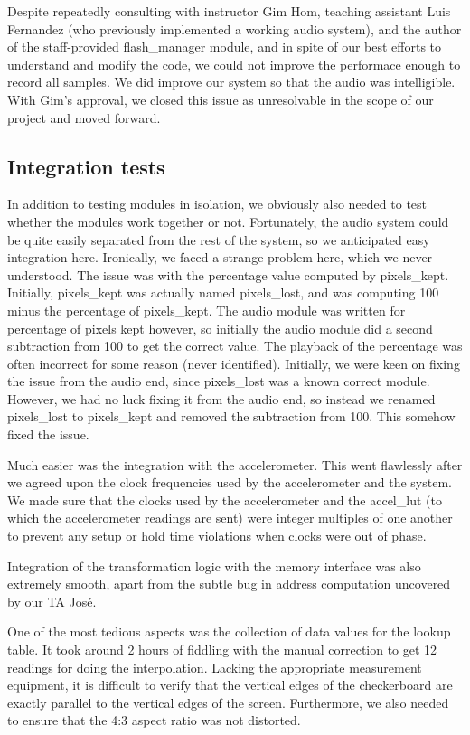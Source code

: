 \documentclass{article}
\begin{document}
Despite repeatedly consulting with instructor Gim Hom, teaching assistant Luis Fernandez (who previously implemented a working audio system), and the author of the staff-provided flash\_manager module,
and in spite of our best efforts to understand and modify the code,
we could not improve the performace enough to record all samples.
We did improve our system so that the audio was intelligible.
With Gim's approval, we closed this issue as unresolvable in the scope of our project and moved forward.

\subsection{Integration tests}
In addition to testing modules in isolation, we obviously also needed to test whether the modules work together or not.
Fortunately, the audio system could be quite easily separated from the rest of the system, so we anticipated easy integration here.
Ironically, we faced a strange problem here, which we never understood.
The issue was with the percentage value computed by pixels\_kept.
Initially, pixels\_kept was actually named pixels\_lost, and was computing 100 minus the percentage of pixels\_kept.
The audio module was written for percentage of pixels kept however,
so initially the audio module did a second subtraction from 100 to get the correct value.
The playback of the percentage was often incorrect for some reason (never identified).
Initially, we were keen on fixing the issue from the audio end, since pixels\_lost was a known correct module.
However, we had no luck fixing it from the audio end, so instead we renamed pixels\_lost to pixels\_kept and removed the subtraction from 100.
This somehow fixed the issue.

Much easier was the integration with the accelerometer.
This went flawlessly after we agreed upon the clock frequencies used by the accelerometer and the system. We made sure that the clocks used by the accelerometer and the accel\_lut (to which the accelerometer readings are sent) were integer multiples of one another to prevent any setup or hold time violations when clocks were out of phase.

Integration of the transformation logic with the memory interface was also extremely smooth,
apart from the subtle bug in address computation uncovered by our TA Jos\'{e}.

One of the most tedious aspects was the collection of data values for the lookup table.
It took around 2 hours of fiddling with the manual correction to get 12 readings for doing the interpolation.
Lacking the appropriate measurement equipment,
it is difficult to verify that the vertical edges of the checkerboard are exactly parallel to the vertical edges of the screen.
Furthermore, we also needed to ensure that the 4:3 aspect ratio was not distorted.
\end{document}
